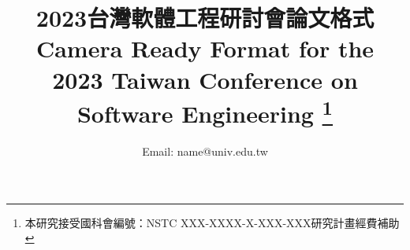 \documentclass[conference,compsoc]{IEEEtran}
\begin{document}
%
\title{2023台灣軟體工程研討會論文格式\\
Camera Ready Format for the \\
2023 Taiwan Conference on Software Engineering
\thanks{本研究接受國科會編號：NSTC XXX-XXXX-X-XXX-XXX研究計畫經費補助}
}

\author{
Email: name@univ.edu.tw}



\end{document}
